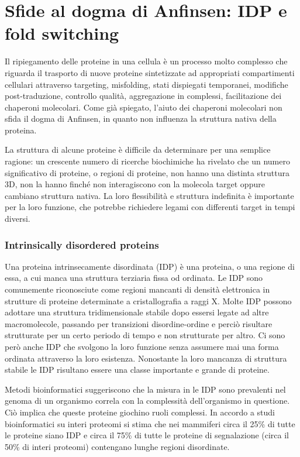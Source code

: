 \section{Sfide al dogma di Anfinsen: IDP e fold switching} \label{sfide-dogma}
{
{

Il ripiegamento delle proteine in una cellula è un processo molto complesso che riguarda il trasporto di nuove proteine sintetizzate ad appropriati compartimenti cellulari attraverso targeting, misfolding, stati dispiegati temporanei, modifiche post-traduzione, controllo qualità, aggregazione in complessi, facilitazione dei chaperoni molecolari. Come già spiegato, l'aiuto dei chaperoni molecolari non sfida il dogma di Anfinsen, in quanto non influenza la struttura nativa della proteina.
	
\par La struttura di alcune proteine è difficile da determinare per una semplice ragione: un crescente numero di ricerche biochimiche ha rivelato che un numero significativo di proteine, o regioni di proteine, non hanno una distinta struttura 3D, non la hanno finché non interagiscono con la molecola target oppure cambiano struttura nativa. La loro flessibilità e struttura indefinita è importante per la loro funzione, che potrebbe richiedere legami con differenti target in tempi diversi. 

}

\subsubsection{Intrinsically disordered proteins}
Una proteina intrinsecamente disordinata (IDP) è una proteina, o una regione di essa, a cui manca una struttura terziaria fissa od ordinata. Le IDP sono comunemente riconosciute come regioni mancanti di densità elettronica in strutture di proteine determinate a cristallografia a raggi X. Molte IDP possono adottare una struttura tridimensionale stabile dopo essersi legate ad altre macromolecole, passando per transizioni disordine-ordine e perciò risultare strutturate per un certo periodo di tempo e non strutturate per altro. Ci sono però anche IDP che svolgono la loro funzione senza assumere mai una forma ordinata attraverso la loro esistenza.
Nonostante la loro mancanza di struttura stabile le IDP risultano essere una classe importante e grande di proteine.

\par Metodi bioinformatici suggeriscono che la misura in le IDP sono prevalenti nel genoma di un organismo correla con la complessità dell'organismo in questione. Ciò implica che queste proteine giochino ruoli complessi. In accordo a studi bioinformatici su interi proteomi si stima che nei mammiferi circa il 25\% di tutte le proteine siano IDP e circa il 75\% di tutte le proteine di segnalazione (circa il 50\% di interi proteomi) contengano lunghe regioni disordinate\supercite{kessel_ben-tal_2018}.

}
